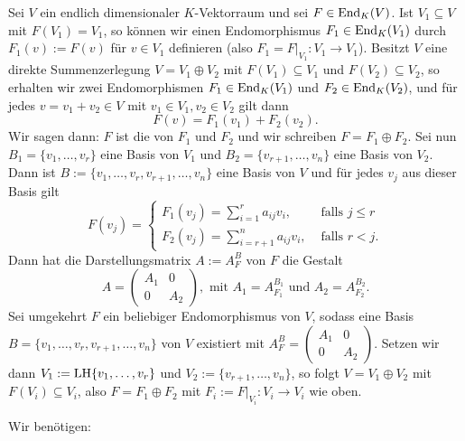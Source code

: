 \begin{lemma}
	\label{def:9.7}
	Sei $V$ ein endlich dimensionaler $K$-Vektorraum und sei $F \in \operatorname{End}_K(V)$.
	Ist $V_1 \subseteq V$ mit $F(V_1) = V_1$, so können wir einen Endomorphismus $F_1 \in \operatorname{End}_K(V_1)$ durch $F_1(v) := F(v)$ für $v \in V_1$ definieren (also $F_1 = F \big|_{V_1} \colon V_1 \rightarrow V_1$).
	Besitzt $V$ eine direkte Summenzerlegung $V = V_1 \oplus V_2$ mit $F(V_1) \subseteq V_1$ und $F(V_2) \subseteq V_2$, so erhalten wir zwei Endomorphismen $F_1 \in \operatorname{End}_K(V_1)$ und $F_2 \in \operatorname{End}_K(V_2)$, und für jedes $v = v_1 + v_2 \in V$ mit $v_1 \in V_1, v_2 \in V_2$ gilt dann
	\[
		F(v) = F_1(v_1) + F_2(v_2).
	\]
	Wir sagen dann: $F$ ist die  von $F_1$ und $F_2$ und wir schreiben $F = F_1 \oplus F_2$.
	Sei nun $B_1 = \{v_1,\dots,v_r\}$ eine Basis von $V_1$ und $B_2 = \{v_{r+1},\dots,v_n\}$ eine Basis von $V_2$.
	Dann ist \linebreak $B := \{v_1,\dots,v_r,v_{r+1},\dots,v_n\}$ eine Basis von $V$ und für jedes $v_j$ aus dieser Basis gilt
	\[
	F(v_j) = \begin{cases}
	F_1(v_j) = \sum_{i=1}^{r} a_{ij} v_i, & \text{ falls } j \leq r \\
	F_2(v_j) = \sum_{i=r+1}^{n} a_{ij} v_i, & \text{ falls } r < j.
	\end{cases}
	\]
	Dann hat die Darstellungsmatrix $A := A_F^B$ von $F$ die Gestalt
	\[
	A = \begin{pmatrix}
	A_1 & 0 \\
	0 & A_2
	\end{pmatrix}, \text{ mit } A_1 = A_{F_1}^{B_1} \text{ und } A_2 = A_{F_2}^{B_2}.
	\]
	Sei umgekehrt $F$ ein beliebiger Endomorphismus von $V$, sodass eine Basis $B = \{v_1,\dots, v_r,v_{r+1},\dots,v_n\}$ von $V$ existiert mit $A_F^B = \begin{pmatrix}
	A_1 & 0 \\
	0 & A_2
	\end{pmatrix}$.
	Setzen wir dann $V_1 := \operatorname{LH}\{v_1,\dots,v_r\}$ und $V_2 := \{v_{r+1},\dots,v_n\}$, so folgt $V = V_1 \oplus V_2$ mit $F(V_i) \subseteq V_i$, also $F = F_1 \oplus F_2$ mit $F_i := F\big|_{V_i} \colon V_i \rightarrow V_i$ wie oben.
\end{lemma}

Wir benötigen:
\newpage